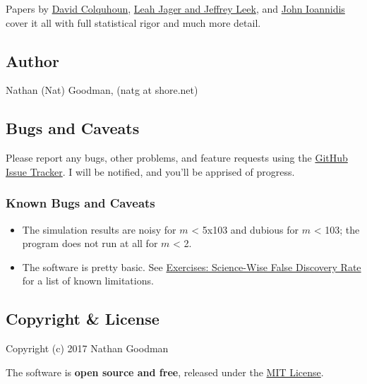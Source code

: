 \documentclass[]{article}
\providecommand{\tightlist}{%
  \setlength{\itemsep}{0pt}\setlength{\parskip}{0pt}}
\begin{document}
Papers by
\href{http://rsos.royalsocietypublishing.org/content/1/3/140216}{David
Colquhoun}, \href{http://doi.org/10.1093/biostatistics/kxt007}{Leah
Jager and Jeffrey Leek}, and
\href{http://dx.plos.org/10.1371/journal.pmed.0020124}{John Ioannidis}
cover it all with full statistical rigor and much more detail.

\subsection{Author}\label{author}

Nathan (Nat) Goodman, (natg at shore.net)

\subsection{Bugs and Caveats}\label{bugs-and-caveats}

Please report any bugs, other problems, and feature requests using the
\href{https://github.com/natgoodman/FDR/issues}{GitHub Issue Tracker}. I
will be notified, and you'll be apprised of progress.

\subsubsection{Known Bugs and Caveats}\label{known-bugs-and-caveats}

\begin{itemize}
\tightlist
\item
  The simulation results are noisy for \(m\) \textless{} 5x103 and
  dubious for \(m\) \textless{} 103; the program does not run at all for
  \(m\) \textless{} 2.
\item
  The software is pretty basic. See \href{exercises.pdf}{Exercises:
  Science-Wise False Discovery Rate} for a list of known limitations.
\end{itemize}

\subsection{Copyright \& License}\label{copyright-license}

Copyright (c) 2017 Nathan Goodman

The software is \textbf{open source and free}, released under the
\href{https://opensource.org/licenses/MIT}{MIT License}.
\end{document}
